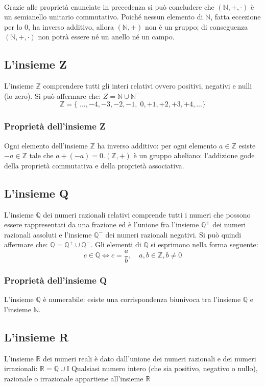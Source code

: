 \documentclass[a4paper,14pt]{extarticle}
\newcommand{\N}{\mathbb{N}}
\newcommand{\R}{\mathbb{R}}
\newcommand{\Z}{\mathbb{Z}}
\newcommand{\Q}{\mathbb{Q}}
\newcommand{\I}{\mathbb{I}}
\begin{document}
\paragraph{}Grazie alle proprietà enunciate in precedenza si può concludere che $(\N, +, \cdot)$ è un semianello unitario commutativo. Poiché nessun elemento di $\N$, fatta eccezione per lo $0$, ha inverso additivo, allora $(\N, +)$ non è un gruppo; di conseguenza $(\N, +, \cdot)$ non potrà essere né un anello né un campo.

\subsection{L'insieme Z}
L'insieme $\Z$ comprendere tutti gli interi relativi ovvero positivi, negativi e nulli (lo zero). Si può affermare che: $Z = \N \cup \N^-$ \[ \Z =\{\;..., -4, -3, -2, -1, \;0, +1, +2, +3, +4, ...\} \]
\subsubsection{Proprietà dell'insieme Z}
Ogni elemento dell'insieme $\Z$ ha inverso additivo: per ogni elemento $a \in \Z$ esiste $-a \in \Z$ tale che $a + (-a) = 0$.\newline $(\Z, +)$ è un gruppo abeliano: l'addizione gode della proprietà commutativa e della proprietà associativa.

\subsection{L'insieme Q}
L'insieme $\Q$ dei numeri razionali relativi comprende tutti i numeri che possono essere rappresentati da una frazione ed è l'unione fra l'insieme $\Q^+$ dei numeri razionali assoluti e l'insieme $\Q^-$ dei numeri razionali negativi. Si può quindi affermare che: $\Q = \Q^+ \cup \Q^-$. \newline
Gli elementi di $\Q$ si esprimono nella forma seguente: \[ c \in \Q \Longleftrightarrow c = \frac{a}{b}, \quad a, b \in \Z, b \neq 0 \]
\subsubsection{Proprietà dell'insieme Q}
L'insieme $\Q$ è numerabile: esiste una corrispondenza biunivoca tra l'insieme $\Q$ e l'insieme $\N$.
\subsection{L'insieme R}
L'insieme $\R$ dei numeri reali è dato dall'unione dei numeri razionali e dei numeri irrazionali: $\R = \Q \cup \I$ \newline
Qualsiasi numero intero (che sia positivo, negativo o nullo), razionale o irrazionale appartiene all'insieme $\R$
\end{document}
